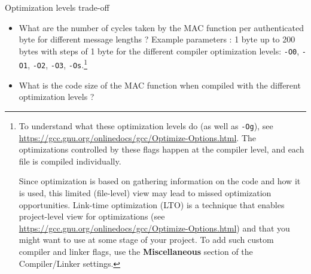 


\begin{bclogo}[couleur = gray!20, arrondi = 0.2, logo=\bcquestion]{Optimization levels trade-off}
    \begin{itemize}
        \item What are the number of cycles taken by the MAC function
            per authenticated byte for different message lengths ? Example parameters : 1 byte up to 200 bytes with steps of 1 byte for the different compiler optimization levels:
            \texttt{-O0},
            \texttt{-O1},
            \texttt{-O2},
            \texttt{-O3},
            \texttt{-Os}.\footnote{%
                To understand what these optimization levels do (as well as
                \texttt{-Og}), see
                \url{https://gcc.gnu.org/onlinedocs/gcc/Optimize-Options.html}.
                The optimizations controlled by these flags happen at the compiler
                level, and each file is compiled individually.

                Since optimization is based on gathering information on the
                code and how it is used, this limited (file-level) view may lead to
                missed optimization opportunities.
                Link-time optimization (LTO) is a technique that enables
                project-level view for optimizations (see
                \url{https://gcc.gnu.org/onlinedocs/gcc/Optimize-Options.html})
                and that you might want to use at some stage of your project.
                To add such custom compiler and linker flags, use the
                \textbf{Miscellaneous} section of the Compiler/Linker settings.
            }
        \item What is the code size of the MAC function when compiled with the different optimization levels ?
    \end{itemize}
\end{bclogo}
